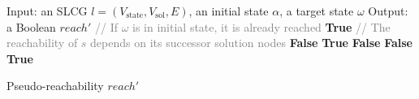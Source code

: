 \begin{algorithm}[ht]
\begin{algorithmic}
    \State Input: an SLCG $l=(V_{\mathrm{state}}, {V_\mathrm{sol}},E)$, an initial state $\alpha$, a target state $\omega$
    \State Output: a Boolean $reach'$
    \State \textcolor{gray}{// If $\omega$ is in initial state, it is already reached}
    \If {$\omega\in \alpha$}
       \State\Return \textbf{True}
    \EndIf
    \State \textcolor{gray}{// The reachability of $s$ depends on its successor solution nodes}
        \State\Return \textbf{False}
    \EndIf
            \State\Return \textbf{True}
        \EndIf
    \EndFor
    \State\Return \textbf{False}
    \EndProcedure
            \State\Return \textbf{False}
        \EndIf
    \EndFor
    \State\Return \textbf{True}
    \EndProcedure
\end{algorithmic}
\caption{Pseudo-reachability $reach'$}\label{algPseudo}
\end{algorithm}

